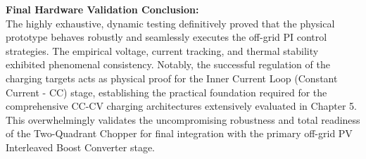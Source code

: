 \textbf{Final Hardware Validation Conclusion:}\\
The highly exhaustive, dynamic testing definitively proved that the physical prototype behaves robustly and seamlessly executes the off-grid PI control strategies. The empirical voltage, current tracking, and thermal stability exhibited phenomenal consistency. Notably, the successful regulation of the charging targets acts as physical proof for the Inner Current Loop (Constant Current - CC) stage, establishing the practical foundation required for the comprehensive CC-CV charging architectures extensively evaluated in Chapter 5. This overwhelmingly validates the uncompromising robustness and total readiness of the Two-Quadrant Chopper for final integration with the primary off-grid PV Interleaved Boost Converter stage.